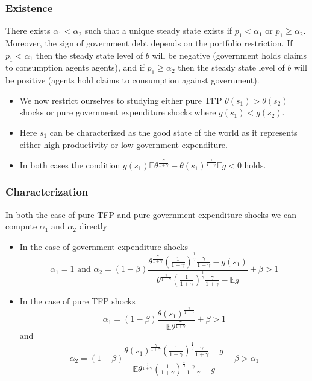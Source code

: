 \documentclass{beamer}
\newcommand{\EE}{\mathbb E}
\begin{document}
\begin{frame}
	\frametitle{Existence}
	\begin{lemma}There exists $\alpha_1<\alpha_2$ such that a unique steady state exists if $p_1 < \alpha_1$  or $p_1 \geq \alpha_2$.  Moreover, the sign of government debt depends on the portfolio restriction.  If $p_{1} < \alpha_1$ then the steady state level of $b$ will be negative (government holds claims to consumption agents agents), and if $p_{1} \geq \alpha_2$ then the steady state level of $b$ will be positive (agents hold claims to consumption against government).  
\end{lemma}
\begin{itemize}
	\item We now restrict ourselves to studying either pure TFP $\theta(s_1) >\theta(s_2)$ shocks or pure government expenditure shocks where $g(s_1) < g(s_2)$. 
	\item  Here $s_1$ can be characterized as the good state of the world as it represents either high productivity or low government expenditure.
	\item  In both cases the condition  $g(s_1)\EE\theta^\frac{\gamma}{1+\gamma}-\theta(s_1)^\frac\gamma{1+\gamma}\EE g < 0$ holds.
\end{itemize}
\end{frame}

\begin{frame}
 \frametitle{Characterization}
	In both the case of pure TFP and pure government expenditure shocks we can compute $\alpha_1$ and $\alpha_2$ directly
	\begin{itemize}
		\item In the case of government expenditure shocks
		\[
			\alpha_1 = 1 \text{  and }  \alpha_2 = (1-\beta)\frac{\theta^\frac{\gamma}{1+\gamma}\left(\frac{1}{1+\gamma}\right)^\frac1\gamma\frac{\gamma}{1+\gamma}-g(s_1)}{\theta^\frac{\gamma}{1+\gamma}\left(\frac{1}{1+\gamma}\right)^\frac1\gamma\frac{\gamma}{1+\gamma}-\EE g} +\beta>1
		\]
		\item In the case of pure TFP shocks
		\[
			\alpha_1 = (1-\beta)\frac{\theta(s_1)^\frac{\gamma}{1+\gamma}}{\EE\theta^\frac{\gamma}{1+\gamma}}+\beta > 1
		\]and
		\[
		\alpha_2 = (1-\beta)\frac{\theta(s_1)^\frac{\gamma}{1+\gamma}\left(\frac{1}{1+\gamma}\right)^\frac1\gamma\frac{\gamma}{1+\gamma}-g}{\EE\theta^\frac{\gamma}{1+\gamma}\left(\frac{1}{1+\gamma}\right)^\frac1\gamma\frac{\gamma}{1+\gamma}-g}+\beta>\alpha_1
		\]
	\end{itemize}
 \end{frame}
\end{document}
